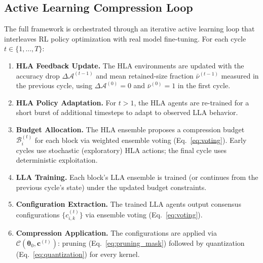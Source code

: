 \documentclass[preprint,12pt,authoryear]{elsarticle}
\begin{document}
\subsection{Active Learning Compression Loop}
\label{sec:active_learning}

The full framework is orchestrated through an iterative active learning loop that
interleaves RL policy optimization with real model fine-tuning. For each cycle
$t \in \{1, \ldots, T\}$:

\begin{enumerate}
    \item \textbf{HLA Feedback Update.} The HLA environments are updated with the
          accuracy drop $\Delta\mathcal{A}^{(t-1)}$ and mean retained-size fraction
          $\bar{\nu}^{(t-1)}$ measured in the previous cycle, using
          $\Delta\mathcal{A}^{(0)}=0$ and $\bar{\nu}^{(0)}=1$ in the first cycle.

    \item \textbf{HLA Policy Adaptation.} For $t > 1$, the HLA agents are re-trained for
          a short burst of additional timesteps to adapt to observed LLA behavior.

    \item \textbf{Budget Allocation.} The HLA ensemble proposes a compression budget
          $\mathcal{B}_i^{(t)}$ for each block via weighted ensemble voting
          (Eq.~\eqref{eq:voting}). Early cycles use stochastic (exploratory) HLA actions;
          the final cycle uses deterministic exploitation.

    \item \textbf{LLA Training.} Each block's LLA ensemble is trained (or continues
          from the previous cycle's state) under the updated budget constraints.

    \item \textbf{Configuration Extraction.} The trained LLA agents output consensus
          configurations $\{c_{i,k}^{(t)}\}$ via ensemble voting
          (Eq.~\eqref{eq:voting}).

    \item \textbf{Compression Application.} The configurations are applied via
          $\mathcal{C}(\boldsymbol{\theta}_0, \mathbf{c}^{(t)})$: pruning
          (Eq.~\eqref{eq:pruning_mask}) followed by quantization
          (Eq.~\eqref{eq:quantization}) for every kernel.


\end{enumerate}
\end{document}
